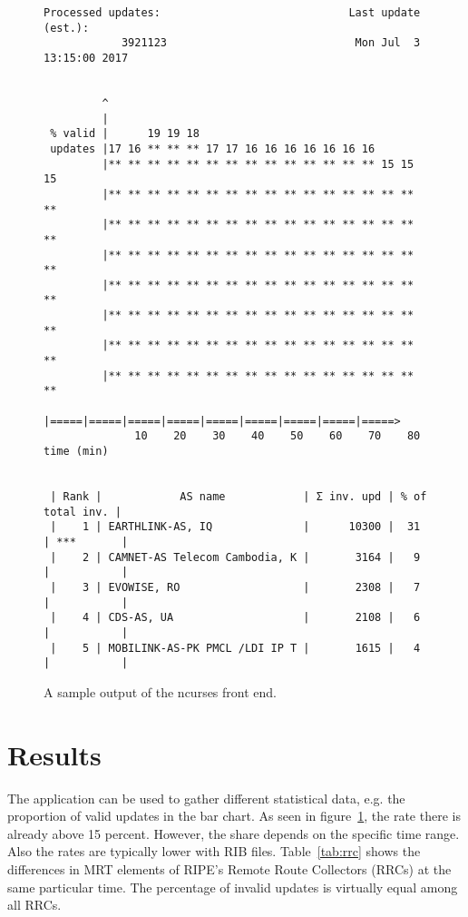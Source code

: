 \begin{figure}
\scriptsize
\begin{Verbatim}[frame=single]
 Processed updates:                             Last update (est.):      
            3921123                             Mon Jul  3 13:15:00 2017 
                                                                         
                                                                         
         ^                                                               
         |                                                               
 % valid |      19 19 18                                                 
 updates |17 16 ** ** ** 17 17 16 16 16 16 16 16 16                      
         |** ** ** ** ** ** ** ** ** ** ** ** ** ** 15 15 15             
         |** ** ** ** ** ** ** ** ** ** ** ** ** ** ** ** **             
         |** ** ** ** ** ** ** ** ** ** ** ** ** ** ** ** **             
         |** ** ** ** ** ** ** ** ** ** ** ** ** ** ** ** **             
         |** ** ** ** ** ** ** ** ** ** ** ** ** ** ** ** **             
         |** ** ** ** ** ** ** ** ** ** ** ** ** ** ** ** **             
         |** ** ** ** ** ** ** ** ** ** ** ** ** ** ** ** **             
         |** ** ** ** ** ** ** ** ** ** ** ** ** ** ** ** **             
         |=====|=====|=====|=====|=====|=====|=====|=====|=====>         
              10    20    30    40    50    60    70    80    time (min) 
                                                                         
                                                                         
 | Rank |            AS name            | Σ inv. upd | % of total inv. | 
 |    1 | EARTHLINK-AS, IQ              |      10300 |  31 | ***       | 
 |    2 | CAMNET-AS Telecom Cambodia, K |       3164 |   9 |           | 
 |    3 | EVOWISE, RO                   |       2308 |   7 |           | 
 |    4 | CDS-AS, UA                    |       2108 |   6 |           | 
 |    5 | MOBILINK-AS-PK PMCL /LDI IP T |       1615 |   4 |           | 
\end{Verbatim}
\caption{A sample output of the ncurses front end.}
\label{fig:output}
\end{figure}

\section{Results}
The application can be used to gather different statistical data, e.g.
the proportion of valid updates in the bar chart. As seen in
figure~\ref{fig:output}, the rate there is already above 15 percent.
However, the share depends on the specific time range. Also the rates
are typically lower with RIB files. Table~\ref{tab:rrc} shows the
differences in MRT elements of RIPE's Remote Route Collectors (RRCs) at
the same particular time. The percentage of invalid updates is virtually
equal among all RRCs.

